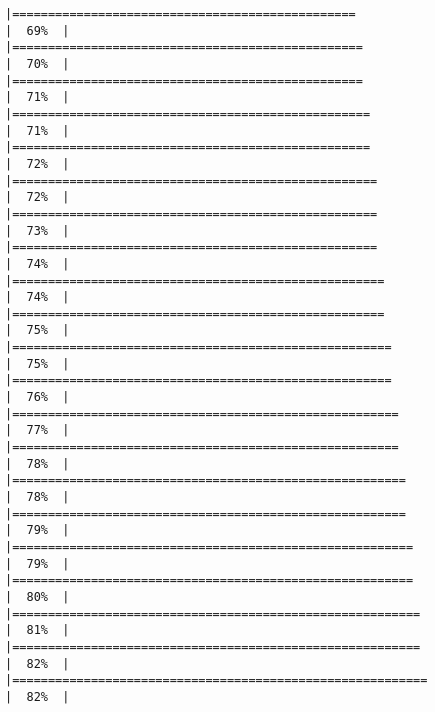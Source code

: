 \documentclass[
]{book}
\begin{document}
\begin{verbatim}
|================================================                      |  69%  |                                                                              |=================================================                     |  70%  |                                                                              |=================================================                     |  71%  |                                                                              |==================================================                    |  71%  |                                                                              |==================================================                    |  72%  |                                                                              |===================================================                   |  72%  |                                                                              |===================================================                   |  73%  |                                                                              |===================================================                   |  74%  |                                                                              |====================================================                  |  74%  |                                                                              |====================================================                  |  75%  |                                                                              |=====================================================                 |  75%  |                                                                              |=====================================================                 |  76%  |                                                                              |======================================================                |  77%  |                                                                              |======================================================                |  78%  |                                                                              |=======================================================               |  78%  |                                                                              |=======================================================               |  79%  |                                                                              |========================================================              |  79%  |                                                                              |========================================================              |  80%  |                                                                              |=========================================================             |  81%  |                                                                              |=========================================================             |  82%  |                                                                              |==========================================================            |  82%  |                                                                              
\end{verbatim}
\end{document}

